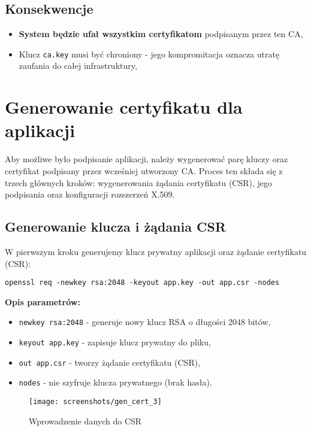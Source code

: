\documentclass{article}
\begin{document}
\subsection{Konsekwencje}
\begin{itemize}
    \item \textbf{System będzie ufał wszystkim certyfikatom} podpisanym przez ten CA,
    \item Klucz \texttt{ca.key} musi być chroniony - jego kompromitacja oznacza utratę zaufania do całej infrastruktury,
\end{itemize}
\section{Generowanie certyfikatu dla aplikacji}

Aby możliwe było podpisanie aplikacji, należy wygenerować parę kluczy oraz certyfikat podpisany przez wcześniej utworzony CA. Proces ten składa się z trzech głównych kroków: wygenerowania żądania certyfikatu (CSR), jego podpisania oraz konfiguracji rozszerzeń X.509. \\

\subsection{Generowanie klucza i żądania CSR}

W pierwszym kroku generujemy klucz prywatny aplikacji oraz żądanie certyfikatu (CSR):

\begin{lstlisting}[style=command, caption=Generowanie klucza i CSR]
openssl req -newkey rsa:2048 -keyout app.key -out app.csr -nodes
\end{lstlisting}

\noindent\textbf{Opis parametrów:}
\begin{itemize}
    \item \texttt{newkey rsa:2048} - generuje nowy klucz RSA o długości 2048 bitów,
    \item \texttt{keyout app.key} - zapisuje klucz prywatny do pliku,
    \item \texttt{out app.csr} - tworzy żądanie certyfikatu (CSR),
    \item \texttt{nodes} - nie szyfruje klucza prywatnego (brak hasła).
\end{itemize}

\begin{figure}[H]
    \centering
    \texttt{[image: screenshots/gen\_cert\_3]}
    \caption{Wprowadzenie danych do CSR}
    \label{fig:cert_dn}
\end{figure}
\end{document}
